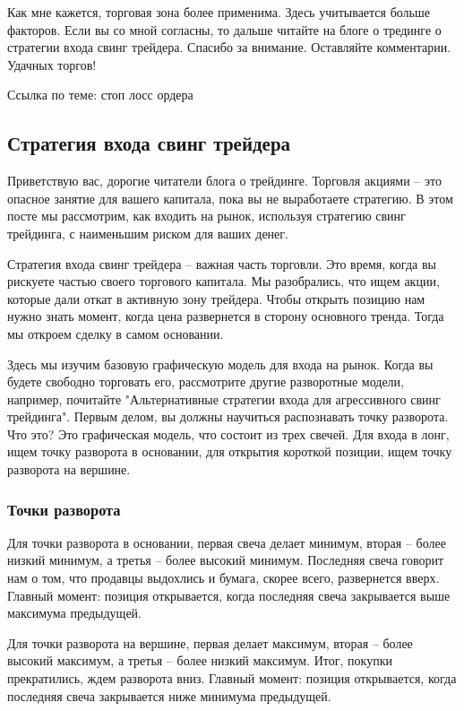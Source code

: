 \documentclass[a5paper]{article}
\begin{document}
Как мне кажется, торговая зона более применима. Здесь учитывается больше факторов. Если вы со мной согласны, то дальше читайте на блоге о трединге о стратегии входа свинг трейдера. Спасибо за внимание. Оставляйте комментарии. Удачных торгов!


Ссылка по теме: стоп лосс ордера

\subsection{Стратегия входа свинг трейдера}

Приветствую вас, дорогие читатели блога о трейдинге. Торговля акциями – это опасное занятие для вашего капитала, пока вы не выработаете стратегию. В этом посте мы рассмотрим, как входить на рынок, используя стратегию свинг трейдинга, с наименьшим риском для ваших денег.

Стратегия входа свинг трейдера – важная часть торговли. Это время, когда вы рискуете частью своего торгового капитала. Мы разобрались, что ищем акции, которые дали откат в активную зону трейдера. Чтобы открыть позицию нам нужно знать момент, когда цена развернется в сторону основного тренда. Тогда мы откроем сделку в самом основании.

Здесь мы изучим базовую графическую модель для входа на рынок. Когда
вы будете свободно торговать его, рассмотрите другие разворотные
модели, например, почитайте "Альтернативные стратегии входа для
агрессивного свинг трейдинга". Первым делом, вы должны научиться
распознавать точку разворота. Что это? Это графическая модель, что
состоит из трех свечей. Для входа в лонг, ищем точку разворота в
основании, для открытия короткой позиции, ищем точку разворота на
вершине.

\subsubsection{Точки разворота}

Для точки разворота в основании, первая свеча делает минимум, вторая – более низкий минимум, а третья – более высокий минимум. Последняя свеча говорит нам о том, что продавцы выдохлись и бумага, скорее всего, развернется вверх. Главный момент: позиция открывается, когда последняя свеча закрывается выше максимума предыдущей.

Для точки разворота на вершине, первая делает максимум, вторая – более высокий максимум, а третья – более низкий максимум. Итог, покупки прекратились, ждем разворота вниз. Главный момент: позиция открывается, когда последняя свеча закрывается ниже минимума предыдущей.
\end{document}
